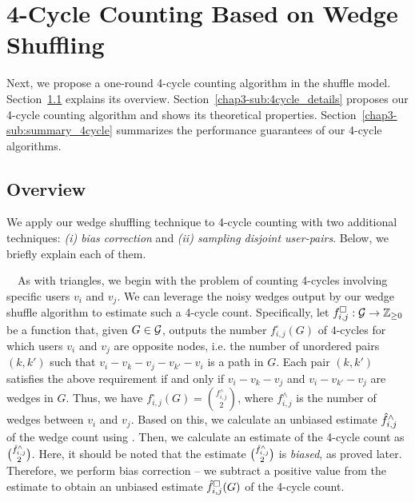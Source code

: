 \section{4-Cycle Counting Based on Wedge Shuffling}
\label{chap3-sec:4cycle}

Next, we propose a one-round 4-cycle counting algorithm in the shuffle model.
Section~\ref{chap3-sub:4cycle_overview} explains its overview.
Section~\ref{chap3-sub:4cycle_details} proposes our 4-cycle counting algorithm and shows its theoretical properties. 
Section~\ref{chap3-sub:summary_4cycle} summarizes the performance guarantees of our 4-cycle algorithms. 

\subsection{Overview}
\label{chap3-sub:4cycle_overview}
We apply our wedge shuffling technique to 4-cycle counting with two additional techniques: \textit{(i) bias correction} and \textit{(ii) sampling disjoint user-pairs}. 
Below, we briefly explain each of them. 

\smallskip
{}~~As with triangles, we begin with the problem of counting 4-cycles involving specific users $v_i$ and $v_j$. 
We can leverage the noisy wedges output by our wedge shuffle algorithm \AlgWS{} to estimate such a 4-cycle count. 
Specifically, let $f^\square_{i,j}: \mathcal{G} \rightarrow \mathbb{Z}_{\ge0}$ be a function that, given $G \in \mathcal{G}$, outputs the number $f^\square_{i,j}(G)$ of $4$-cycles for which users $v_i$ and $v_j$ are opposite nodes, i.e. the number of unordered pairs $(k,k')$ such that $v_i-v_k-v_j-v_{k'}-v_i$ is a path in $G$.
Each pair $(k,k')$ satisfies the above requirement if and only if $v_i-v_k-v_j$ and $v_i-v_{k'}-v_j$ are wedges in $G$.
Thus, we have $f^\square_{i,j}(G) = \binom{f^\wedge_{i,j}}{2}$, where $f^\wedge_{i,j}$ is the number of wedges between $v_i$ and $v_j$. 
Based on this, we calculate an unbiased estimate $\hat{f}^\wedge_{i,j}$ of the wedge count using \AlgWS{}. 
Then, we calculate an estimate of the 4-cycle count as $\binom{\hat{f}^\wedge_{i,j}}{2}$. 
Here, it should be noted that the estimate $\binom{\hat{f}^\wedge_{i,j}}{2}$ 
is \textit{biased}, as proved later. 
Therefore, 
we perform bias correction -- we subtract a positive value from the estimate to obtain an unbiased estimate $\hat{f}_{i,j}^\square(G)$ of the 4-cycle count. 

